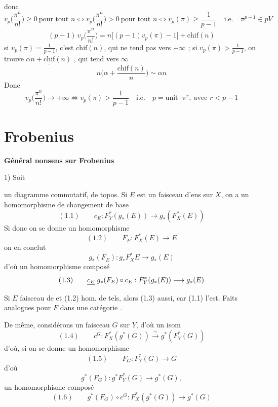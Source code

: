 \documentclass[11pt,a4paper]{article}
\begin{document}
donc
\[
v_p\Big(\frac{\pi^{n}}{n!}\Big) \geq 0 \ \text{pour tout } n
\iff v_p\Big(\frac{\pi^{n}}{n!}\Big) > 0 \ \text{pour tout } n
\iff v_p(\pi) \geq \frac{1}{p-1} \quad \text{i.e.} \quad \pi^{p-1} \in pV
\]
\[
(p-1)\,v_p\Big(\frac{\pi^{n}}{n!}\Big) = n\big[(p-1)v_p(\pi) - 1\big] + \mathrm{chif}(n)
\]
si $v_p(\pi) = \frac{1}{p-1}$, c'est $\mathrm{chif}(n)$, qui ne tend pas vers
$+\infty$ ; si $v_p(\pi) > \frac{1}{p-1}$, on trouve $\underline{\alpha n +
\mathrm{chif}(n)}$ , qui tend vers $\infty$
\[
n\Big(\alpha + \frac{\mathrm{chif}(n)}{n}\Big) \sim \alpha n
\]
Donc 
\[
v_p\Big(\frac{\pi^{n}}{n!}\Big) \to +\infty \iff v_p(\pi) > \frac{1}{p-1}
\quad \text{i.e.} \quad p = \text{unit}\cdot\pi^{r}, \ \text{avec } r < p-1
\]

\section*{Frobenius}



\textbf{Général nonsens sur Frobenius}

1) Soit


un diagramme commutatif, \struck{\ill{}} de topos. Si $E$ est un faisceau
d'ens sur $X$, on a  \struck{\ill{}} un
homomorphisme de changement de base
\[
(1.1) \qquad c_E : F_Y^{*}(g_*(E)) \longrightarrow g_*(F_X^{*}(E))
\]
Si donc on se donne un homomorphisme
\[
(1.2) \qquad F_E : F_X^{*}(E) \longrightarrow E
\]
on en conclut
\[
g_*(F_E) : g_* F_X^{*} E \longrightarrow g_*(E)
\]
d'où un homomorphisme composé
\[
(1.3) \qquad \struck{c_E}\; g_*(F_E) \circ c_E : F_Y^{*}(g_*(E)) \longrightarrow g_*(E)
\]
 Si $E$ faisceau de \ill{} et (1.2) hom.
de tels, alors (1.3) aussi, car (1.1) l'est. Faits analogues pour $F$ dans une
catégorie \ill{}.

De même, considérons un faisceau $G$ sur $Y$, d'où un isom
\[
(1.4) \qquad c^{G} : F_X^{*}(g^{*}(G)) \xrightarrow{\;\sim\;} g^{*}(F_Y^{*}(G))
\]
d'où, si on se donne un homomorphisme
\[
(1.5) \qquad F_G : F_Y^{*}(G) \longrightarrow G
\]
d'où
\[
g^{*}(F_G) : g^{*}F_Y^{*}(G) \longrightarrow g^{*}(G) ,
\]
un homomorphisme composé
\[
(1.6) \qquad g^{*}(F_G) \circ c^{G} : F_X^{*}(g^{*}(G)) \longrightarrow g^{*}(G)
\]
\end{document}
